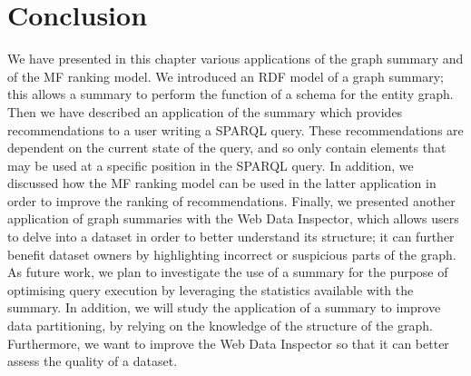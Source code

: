 \section{Conclusion}

We have presented in this chapter various applications of the graph summary and of the \gls{MF} ranking model. We introduced an RDF model of a graph summary; this allows a summary to perform the function of a schema for the entity graph. Then we have described an application of the summary which provides recommendations to a user writing a SPARQL query. These recommendations are dependent on the current state of the query, and so only contain elements that may be used at a specific position in the SPARQL query. In addition, we discussed how the \gls{MF} ranking model can be used in the latter application in order to improve the ranking of recommendations. Finally, we presented another application of graph summaries with the Web Data Inspector, which allows users to delve into a dataset in order to better understand its structure; it can further benefit dataset owners by highlighting incorrect or suspicious parts of the graph.\\

As future work, we plan to investigate the use of a summary for the purpose of optimising query execution by leveraging the statistics available with the summary. In addition, we will study the application of a summary to improve data partitioning, by relying on the knowledge of the structure of the graph. Furthermore, we want to improve the Web Data Inspector so that it can better assess the quality of a dataset.
